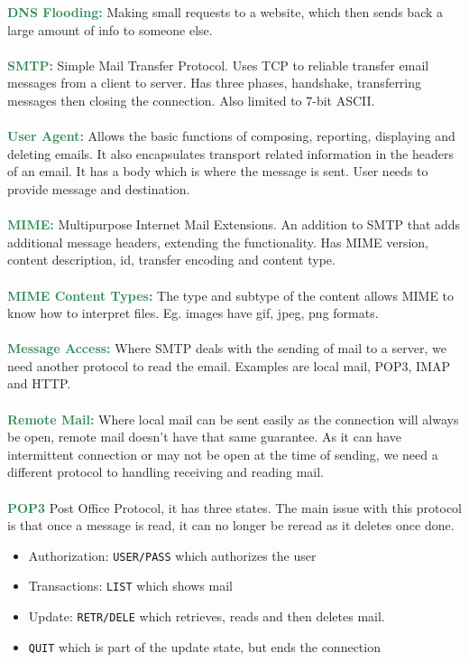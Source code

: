 \documentclass[a4paper,10pt]{article}
\begin{document}
\textcolor{SeaGreen}{\textbf{DNS Flooding:}} Making small requests to a website, which then sends back a large amount of info to someone else. \\\\
\textcolor{SeaGreen}{\textbf{SMTP:}} Simple Mail Transfer Protocol. Uses TCP to reliable transfer email messages from a client to server. Has three phases, handshake, transferring messages then closing the connection. Also limited to 7-bit ASCII. \\\\
\newpage
\noindent \textcolor{SeaGreen}{\textbf{User Agent:}} Allows the basic functions of composing, reporting, displaying and deleting emails. It also encapsulates transport related information in the headers of an email. It has a body which is where the message is sent. User needs to provide message and destination. \\\\
\textcolor{SeaGreen}{\textbf{MIME:}} Multipurpose Internet Mail Extensions. An addition to SMTP that adds additional message headers, extending the functionality. Has MIME version, content description, id, transfer encoding and content type. \\\\
\textcolor{SeaGreen}{\textbf{MIME Content Types:}} The type and subtype of the content allows MIME to know how to interpret files. Eg. images have gif, jpeg, png formats. \\\\
\textcolor{SeaGreen}{\textbf{Message Access:}} Where SMTP deals with the sending of mail to a server, we need another protocol to read the email. Examples are local mail, POP3, IMAP and HTTP. \\\\
\textcolor{SeaGreen}{\textbf{Remote Mail:}} Where local mail can be sent easily as the connection will always be open, remote mail doesn't have that same guarantee. As it can have intermittent connection or may not be open at the time of sending, we need a different protocol to handling receiving and reading mail. \\\\
\textcolor{SeaGreen}{\textbf{POP3}} Post Office Protocol, it has three states. The main issue with this protocol is that once a message is read, it can no longer be reread as it deletes once done. 
\begin{itemize}
	\item Authorization: \texttt{USER/PASS} which authorizes the user 
	\item Transactions: \texttt{LIST} which shows mail
	\item Update: \texttt{RETR/DELE} which retrieves, reads and then deletes mail. 
	\item \texttt{QUIT} which is part of the update state, but ends the connection 
\end{itemize}
\end{document}
